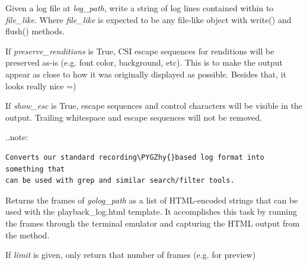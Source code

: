 \documentclass[letterpaper,10pt,openany]{sphinxmanual}
\def\PYGZhy{\char`\-}
\begin{document}

\begin{fulllineitems}
\label{Developer/logviewer:logviewer.flatten_log}
Given a log file at \emph{log\_path}, write a string of log lines contained
within to \emph{file\_like}.  Where \emph{file\_like} is expected to be any file-like
object with write() and flush() methods.

If \emph{preserve\_renditions} is True, CSI escape sequences for renditions will
be preserved as-is (e.g. font color, background, etc).  This is to make the
output appear as close to how it was originally displayed as possible.
Besides that, it looks really nice =)

If \emph{show\_esc} is True, escape sequences and control characters will be
visible in the output.  Trailing whitespace and escape sequences will not be
removed.

..note:

\begin{Verbatim}[commandchars=\\\{\}]
Converts our standard recording\PYGZhy{}based log format into something that
can be used with grep and similar search/filter tools.
\end{Verbatim}

\end{fulllineitems}


\begin{fulllineitems}
\label{Developer/logviewer:logviewer.render_log_frames}
Returns the frames of \emph{golog\_path} as a list of HTML-encoded strings that
can be used with the playback\_log.html template.  It accomplishes this task
by running the frames through the terminal emulator and capturing the HTML
output from the  method.

If \emph{limit} is given, only return that number of frames (e.g. for preview)

\end{fulllineitems}

\end{document}
